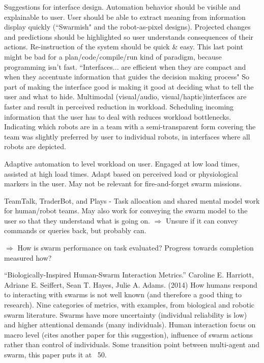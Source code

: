 \documentclass[]{article}
\begin{document}
Suggestions for interface design. Automation behavior should be visible and explainable to user. User should be able to extract meaning from information display quickly (``Swarmish" and the robot-as-pixel designs). Projected changes and predictions should be highlighted so user understands consequences of their actions. Re-instruction of the system should be quick \& easy. This last point might be bad for a plan/code/compile/run kind of paradigm, because programming isn't fast. ``Interfaces... are efficient when they are compact and when they accentuate information that guides the decision making process" So part of making the interface good is making it good at deciding what to tell the user and what to hide. Multimodal (visual/audio, visual/haptic)interfaces are faster and result in perceived reduction in workload. Scheduling incoming information that the user has to deal with reduces workload bottlenecks. Indicating which robots are in a team with a semi-transparent form covering the team was slightly preferred by user to individual robots, in interfaces where all robots are depicted. 

Adaptive automation to level workload on user. Engaged at low load times, assisted at high load times. Adapt based on perceived load or physiological markers in the user. May not be relevant for fire-and-forget swarm missions. 

TeamTalk, TraderBot, and Plays - Task allocation and shared mental model work for human/robot teams. May also work for conveying the swarm model to the user so that they understand what is going on. $\Rightarrow$ Unsure if it can convey commands or queries back, but probably can. 

$\Rightarrow$ How is swarm performance on task evaluated? Progress towards completion measured how?

``Biologically-Inspired Human-Swarm Interaction Metrics.'' \cite{harriott2014biologically} Caroline E. Harriott, Adriane E. Seiffert, Sean T. Hayes, Julie A. Adams. (2014) How humans respond to interacting with swarms is not well known (and therefore a good thing to research). Nine categories of metrics, with examples, from biological and robotic swarm literature. Swarms have more uncertainty (individual reliability is low) and higher attentional demands (many individuals). Human interaction focus on macro level (cites another paper for this suggestion), influence of swarm actions rather than control of individuals. Some transition point between multi-agent and swarm, this paper puts it at ~50. 
\end{document}
